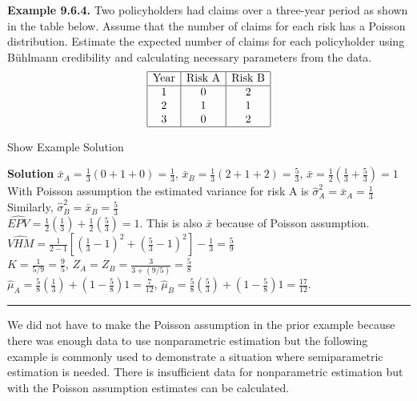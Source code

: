 \documentclass[]{book}
\theoremstyle{definition}
\theoremstyle{definition}
\theoremstyle{definition}
\theoremstyle{remark}
\begin{document}
\textbf{Example 9.6.4.} Two policyholders had claims over a three-year
period as shown in the table below. Assume that the number of claims for
each risk has a Poisson distribution. Estimate the expected number of
claims for each policyholder using Bühlmann credibility and calculating
necessary parameters from the data. \[\begin{matrix}
\begin{array}{|c|c|c|}
\hline
\text{Year} & \text{Risk A} & \text{Risk B} \\
\hline
1 & 0 &  2 \\
2 & 1 &  1  \\  
3 & 0 &  2  \\              
\hline
\end{array}
\end{matrix}\]

Show Example Solution

\hypertarget{toggleExampleCred.6.4}{}
\textbf{Solution} \(\bar{x}_A=\frac{1}{3}(0+1+0)=\frac{1}{3}\),
\(\bar{x}_B=\frac{1}{3}(2+1+2)=\frac{5}{3}\),
\(\bar{x}=\frac{1}{2}(\frac{1}{3}+\frac{5}{3})=1\)\\
With Poisson assumption the estimated variance for risk A is
\(\hat\sigma_A^2=\bar{x}_A=\frac{1}{3}\)\\
Similarly, \(\hat\sigma_B^2=\bar{x}_B=\frac{5}{3}\)\\
\(\widehat{EPV}=\frac{1}{2}(\frac{1}{3})+\frac{1}{2}(\frac{5}{3})=1\).
This is also \(\bar{x}\) because of Poisson assumption.\\
\(\widehat{VHM}=\frac{1}{2-1}\left[(\frac{1}{3}-1)^2+(\frac{5}{3}-1)^2\right]-\frac{1}{3}=\frac{5}{9}\)\\
\(K=\frac{1}{5/9}=\frac{9}{5}\),
\(Z_A=Z_B=\frac{3}{3+(9/5)}=\frac{5}{8}\)\\
\(\hat{\mu}_A=\frac{5}{8}\left(\frac{1}{3}\right)+(1-\frac{5}{8})1=\frac{7}{12}\),
\(\hat{\mu}_B=\frac{5}{8}\left(\frac{5}{3}\right)+(1-\frac{5}{8})1=\frac{17}{12}.\)

\begin{center}\rule{0.5\linewidth}{\linethickness}\end{center}

We did not have to make the Poisson assumption in the prior example
because there was enough data to use nonparametric estimation but the
following example is commonly used to demonstrate a situation where
semiparametric estimation is needed. There is insufficient data for
nonparametric estimation but with the Poisson assumption estimates can
be calculated.
\end{document}
